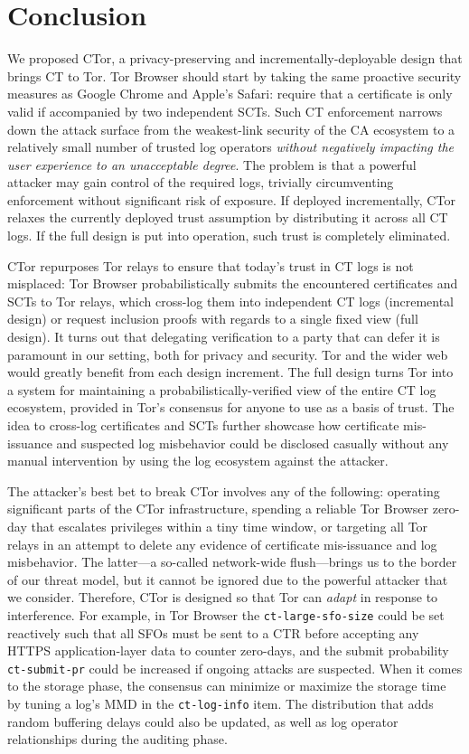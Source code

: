 \section{Conclusion} \label{sec:conclusion} 
We proposed CTor, a privacy-preserving and incrementally-deployable design that
brings CT to Tor.  Tor Browser should start by taking the same proactive
security measures as Google Chrome and Apple's Safari:
	require that a certificate is only valid if accompanied by two
	independent SCTs.
Such CT enforcement narrows down the attack surface from the weakest-link
security of the CA ecosystem to a relatively small number of trusted log
operators \emph{without negatively impacting the user experience to an
unacceptable degree}.  The problem is that a powerful attacker may gain control
of the required logs, trivially circumventing enforcement without significant
risk of exposure.  If deployed incrementally, CTor relaxes the currently
deployed trust assumption by distributing it across all CT logs.  If the full
design is put into operation, such trust is completely eliminated.

CTor repurposes Tor relays to ensure that today's trust in CT logs is not
misplaced:
	Tor Browser probabilistically submits the encountered certificates and SCTs
	to Tor relays, which
		cross-log them into independent CT logs (incremental design)
		or request inclusion proofs with regards to a single fixed view
			(full design).
It turns out that delegating verification to a party that can defer it
is paramount in our setting, both for privacy and security.  Tor and the wider
web would greatly benefit from each design increment.  The full design turns Tor
into a
system for maintaining a probabilistically-verified view of the entire CT log
ecosystem, provided in Tor's consensus for anyone to use as a basis of trust.
The idea to cross-log certificates and SCTs further showcase how certificate
mis-issuance and suspected log misbehavior could be disclosed casually without
any manual intervention by using the log ecosystem against the attacker.

The attacker's best bet to break CTor involves any of the following:
	operating significant parts of the CTor infrastructure,
	spending a reliable Tor Browser zero-day that escalates privileges within a
		tiny time window, or
	targeting all Tor relays in an attempt to delete any evidence of certificate
		mis-issuance and log misbehavior.
The latter---a so-called network-wide flush---brings us to the border of our
threat model, but it cannot be ignored due to the powerful attacker that we
consider.  Therefore, CTor is designed so that Tor can \emph{adapt} in response
to interference.  For example, in Tor Browser the \texttt{ct-large-sfo-size}
could be set reactively such that all SFOs must be sent to a CTR before
accepting any HTTPS application-layer data to counter zero-days, and the submit
probability \texttt{ct-submit-pr} could be increased if ongoing attacks are
suspected.  When it comes to the storage phase, the consensus can minimize or
maximize the storage time by tuning a log's MMD in the \texttt{ct-log-info}
item.  The distribution that adds random buffering delays could also be updated,
as well as log operator relationships during the auditing phase.
